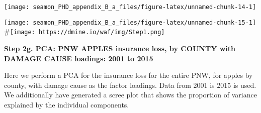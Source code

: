 \documentclass[]{article}
\newenvironment{Shaded}{\begin{snugshade}}{\end{snugshade}}
\newcommand{\CommentTok}[1]{\textcolor[rgb]{0.56,0.35,0.01}{\textit{#1}}}
\newcommand{\DataTypeTok}[1]{\textcolor[rgb]{0.13,0.29,0.53}{#1}}
\newcommand{\DecValTok}[1]{\textcolor[rgb]{0.00,0.00,0.81}{#1}}
\newcommand{\KeywordTok}[1]{\textcolor[rgb]{0.13,0.29,0.53}{\textbf{#1}}}
\newcommand{\NormalTok}[1]{#1}
\newcommand{\OperatorTok}[1]{\textcolor[rgb]{0.81,0.36,0.00}{\textbf{#1}}}
\newcommand{\StringTok}[1]{\textcolor[rgb]{0.31,0.60,0.02}{#1}}
\begin{document}
\texttt{[image: seamon\_PHD\_appendix\_B\_a\_files/figure-latex/unnamed-chunk-14-1]}

\begin{Shaded}
\end{Shaded}

\texttt{[image: seamon\_PHD\_appendix\_B\_a\_files/figure-latex/unnamed-chunk-15-1]}
\#\texttt{[image: https://dmine.io/waf/img/Step1.png]}

\textbf{Step 2g. PCA: PNW APPLES insurance loss, by COUNTY with DAMAGE
CAUSE loadings: 2001 to 2015}

Here we perform a PCA for the insurance loss for the entire PNW, for
apples by county, with damage cause as the factor loadings. Data from
2001 is 2015 is used. We additionally have generated a scree plot that
shows the proportion of variance explained by the individual components.
\end{document}

